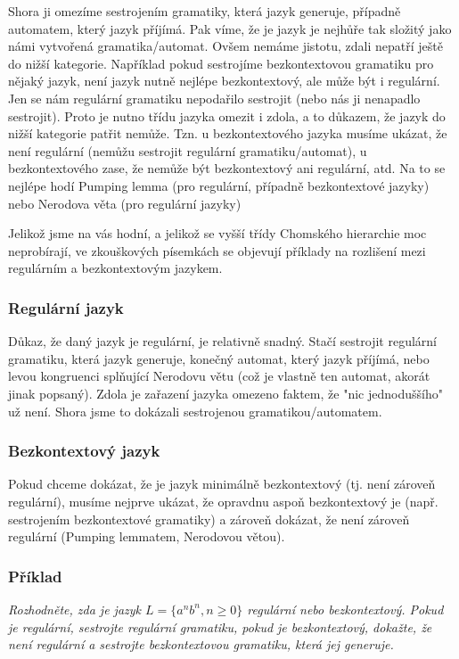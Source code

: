 \documentclass{article}
\begin{document}
Shora ji omezíme sestrojením gramatiky, která jazyk generuje, případně automatem, který jazyk příjímá.
Pak víme, že je jazyk je nejhůře tak složitý jako námi vytvořená gramatika/automat.
Ovšem nemáme jistotu, zdali nepatří ještě do nižší kategorie.
Například pokud sestrojíme bezkontextovou gramatiku pro nějaký jazyk, není jazyk nutně nejlépe bezkontextový, ale může být i regulární.
Jen se nám regulární gramatiku nepodařilo sestrojit (nebo nás ji nenapadlo sestrojit).
Proto je nutno třídu jazyka omezit i zdola, a to důkazem, že jazyk do nižší kategorie patřit nemůže.
Tzn. u bezkontextového jazyka musíme ukázat, že není regulární (nemůžu sestrojit regulární gramatiku/automat), u bezkontextového zase, že nemůže být bezkontextový ani regulární, atd. Na to se nejlépe hodí Pumping lemma (pro regulární, případně bezkontextové jazyky) nebo Nerodova věta (pro regulární jazyky)

Jelikož jsme na vás hodní, a jelikož se vyšší třídy Chomského hierarchie moc neprobírají, ve zkouškových písemkách se objevují příklady na rozlišení mezi regulárním a bezkontextovým jazykem.

\subsubsection{Regulární jazyk}

Důkaz, že daný jazyk je regulární, je relativně snadný. Stačí sestrojit regulární gramatiku, která jazyk generuje, konečný automat, který jazyk příjímá, nebo levou kongruenci splňující Nerodovu větu (což je vlastně ten automat, akorát jinak popsaný). Zdola je zařazení jazyka omezeno faktem, že "nic jednoduššího" už není. Shora jsme to dokázali sestrojenou gramatikou/automatem.

\subsubsection{Bezkontextový jazyk}
Pokud chceme dokázat, že je jazyk minimálně bezkontextový (tj. není zároveň regulární), musíme nejprve ukázat, že opravdnu aspoň bezkontextový je (např. sestrojením bezkontextové gramatiky) a zároveň dokázat, že není zároveň regulární (Pumping lemmatem, Nerodovou větou).

\subsubsection{Příklad}
\emph{Rozhodněte, zda je jazyk $L = \{a^nb^n, n\geq0 \}$ regulární nebo bezkontextový.
Pokud je regulární, sestrojte regulární gramatiku, pokud je bezkontextový, dokažte, že není regulární a sestrojte bezkontextovou gramatiku, která jej generuje.}
\end{document}
